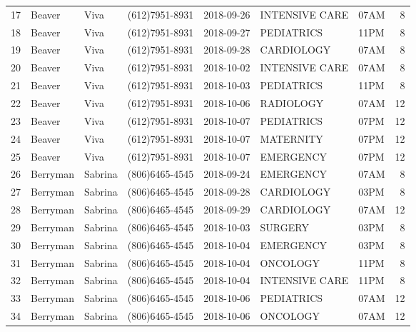 \documentclass[11pt]{article}
\begin{document}
\begin{tabular}{|l|l|l|l|l|l|l|r|}
	17 &     Beaver &     Viva &  (612)7951-8931 &  2018-09-26 &  INTENSIVE CARE &  07AM &             8 \\
	18 &     Beaver &     Viva &  (612)7951-8931 &  2018-09-27 &      PEDIATRICS &  11PM &             8 \\
	19 &     Beaver &     Viva &  (612)7951-8931 &  2018-09-28 &      CARDIOLOGY &  07AM &             8 \\
	20 &     Beaver &     Viva &  (612)7951-8931 &  2018-10-02 &  INTENSIVE CARE &  07AM &             8 \\
	21 &     Beaver &     Viva &  (612)7951-8931 &  2018-10-03 &      PEDIATRICS &  11PM &             8 \\
	22 &     Beaver &     Viva &  (612)7951-8931 &  2018-10-06 &       RADIOLOGY &  07AM &            12 \\
	23 &     Beaver &     Viva &  (612)7951-8931 &  2018-10-07 &      PEDIATRICS &  07PM &            12 \\
	24 &     Beaver &     Viva &  (612)7951-8931 &  2018-10-07 &       MATERNITY &  07PM &            12 \\
	25 &     Beaver &     Viva &  (612)7951-8931 &  2018-10-07 &       EMERGENCY &  07PM &            12 \\
	26 &   Berryman &  Sabrina &  (806)6465-4545 &  2018-09-24 &       EMERGENCY &  07AM &             8 \\
	27 &   Berryman &  Sabrina &  (806)6465-4545 &  2018-09-28 &      CARDIOLOGY &  03PM &             8 \\
	28 &   Berryman &  Sabrina &  (806)6465-4545 &  2018-09-29 &      CARDIOLOGY &  07AM &            12 \\
	29 &   Berryman &  Sabrina &  (806)6465-4545 &  2018-10-03 &         SURGERY &  03PM &             8 \\
	30 &   Berryman &  Sabrina &  (806)6465-4545 &  2018-10-04 &       EMERGENCY &  03PM &             8 \\
	31 &   Berryman &  Sabrina &  (806)6465-4545 &  2018-10-04 &        ONCOLOGY &  11PM &             8 \\
	32 &   Berryman &  Sabrina &  (806)6465-4545 &  2018-10-04 &  INTENSIVE CARE &  11PM &             8 \\
	33 &   Berryman &  Sabrina &  (806)6465-4545 &  2018-10-06 &      PEDIATRICS &  07AM &            12 \\
	34 &   Berryman &  Sabrina &  (806)6465-4545 &  2018-10-06 &        ONCOLOGY &  07AM &            12 \\

\end{tabular}
\end{document}
